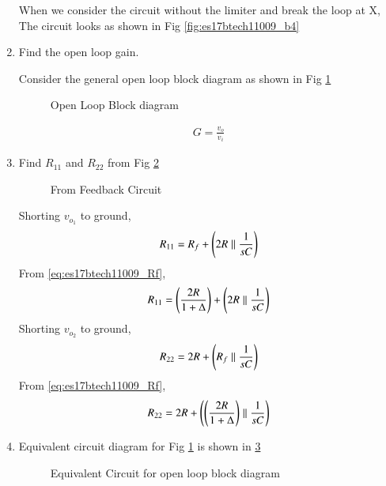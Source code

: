 \begin{enumerate}[label=\arabic*.,ref=\theenumi]
When we consider the circuit without the limiter and break the loop at X, The circuit looks as shown in Fig \ref{fig:es17btech11009_b4}
\renewcommand{\thefigure}{\theenumi.\arabic{figure}}

\item
Find the open loop gain.

Consider the general open loop block diagram as shown in Fig \ref{fig:es17btech11009_block1}
\renewcommand{\thefigure}{\theenumi.\arabic{figure}}
\begin{figure}[!ht]
	\begin{center}
		\resizebox{\columnwidth}{!}{}
	\end{center}
\caption{Open Loop Block diagram}
\label{fig:es17btech11009_block1}
\end{figure}
\begin{align}
    G = \frac{v_{o}}{v_{i}} 
\end{align}
\item
Find $R_{11}$ and $R_{22}$ from Fig \ref{fig:es17btech11009_R}
\renewcommand{\thefigure}{\theenumi.\arabic{figure}}
\begin{figure}[!ht]
	\begin{center}
		\resizebox{\columnwidth}{!}{}
	\end{center}
\caption{From Feedback Circuit}
\label{fig:es17btech11009_R}
\end{figure}

Shorting $v_{o_1}$ to ground,
\begin{align}
    R_{11} = R_{f} + \left(2R\parallel \frac{1}{sC}\right)
\end{align}
From \eqref{eq:es17btech11009_Rf},
\begin{align}
    R_{11} = \left(\frac{2R}{1+ \Delta}\right) + \left(2R \parallel \frac{1}{sC}\right)
\end{align}
Shorting $v_{o_2}$ to ground,
\begin{align}
    R_{22} = 2R + \left(R_{f}\parallel \frac{1}{sC}\right)
\end{align}
From \eqref{eq:es17btech11009_Rf},
\begin{align}
    R_{22} =  2R + \left(\left(\frac{2R}{1 + \Delta}\right)\parallel \frac{1}{sC}\right)
\end{align}

\item
Equivalent circuit diagram for Fig \ref{fig:es17btech11009_block1} is shown in \ref{fig:es17btech11009_block2}
\renewcommand{\thefigure}{\theenumi.\arabic{figure}}
\begin{figure}[!ht]
	\begin{center}
		\resizebox{\columnwidth}{!}{}
	\end{center}
\caption{Equivalent Circuit for open loop block diagram}
\label{fig:es17btech11009_block2}
\end{figure}


\end{enumerate}
